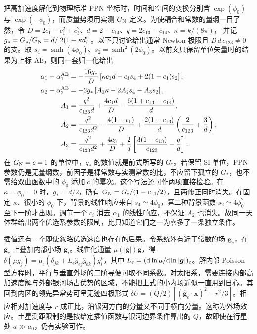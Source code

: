 把高加速度解化到物理标准 PPN 坐标时，时间和空间的变换分别含 $\exp(\phi_0)$ 与 $\exp(-\phi_0)$，而质量势须用实测 $G_{\rm N}$ 定义。为使耦合和常数的量纲一目了然，令
$D=2c_1-c_1^2+c_3^2$、$d=2-c_{14}$、$q=2c_{13}-c_{14}$、$\kappa=k/(8\pi)$，
并记 $g_*=G_*/G_{\rm N}=d/[2(1+\kappa d)]$。以下只讨论给出通常 Newton 极限且 $D\,d\,c_{123}\ne0$ 的支。取 $s_4=\sinh(4\phi_0)$、$s_2=\sinh^2(2\phi_0)$。以前文只保留单位矢量时的结果为上标 $\mathrm{AE}$，则同一套归一化给出
\begin{align*}
 \alpha_1-\alpha_1^{\rm AE}
     &=-\frac{16g_*}{D}
            \left[\kappa c_1 d-c_3s_4+2(1-c_1)s_2\right],\\
 \alpha_2-\alpha_2^{\rm AE}
     &=-2g_*\left[A_1 \kappa-2A_2s_4-A_3s_2\right],\\
 A_1&=\frac{q^2}{c_{123}d}+\frac{4c_1d}{D}
                    -\frac{6(1+c_{13}-c_{14})}{d},\\
 A_2&=\frac{q^2}{c_{123}d^2}-\frac{4(1-c_1)}{D}
                +\frac{2(1-c_{13})}{d}\left(\frac{2}{c_{123}}+\frac{3}{d}\right),\\
 A_3&=\frac{q^2}{c_{123}d^2}+\frac{4c_3}{D}
                +\frac{2}{d}\left[\frac{3(1-c_{13})}{c_{123}}-\frac{q}{d}\right].
\end{align*}
在 $G_{\rm N}=c=1$ 的单位中，$g_*$ 的数值就是前式所写的 $G_*$。若保留 SI 单位，PPN 参数仍是无量纲数，前因子是裸常数与实测常数的比，不应留下孤立的 $G_*$，也不需给双曲函数中的 $\phi_0$ 添加 $c$ 的幂次。这个写法还可作两项直接检验。在 $\kappa=\phi_0=0$ 时，$g_*=d/2$，确有 $G_{\rm N}=G_*/(1-c_{14}/2)$，且两修正同时消失。在固定 $\kappa$、很小的 $\phi_0$ 下，背景的线性响应来自 $s_4\simeq4\phi_0$，第二种背景函数 $s_2\simeq4\phi_0^2$ 至下一阶才出现。调节一个 $c_i$ 消去 $\alpha_1$ 的线性响应，不保证 $A_2$ 也消失。故同一天体群给出两个优选系参数的限制，比只知道它们之一为零多了一条独立条件。

插值还有一个即使忽略优选速度也存在的后果。令系统外有近于常数的场 $\bm g_e$，在 $\bm g_e$ 上叠加内部小场 $\bm g_i$。线性化通量 $\mu(|\bm g|)\bm g$，得 $\delta(\mu g_j)=\mu_e(\delta_{jk}+L_e\hat g_{e j}\hat g_{e k})g_i^k$，其中 $L_e=(\dd\ln\mu/\dd\ln|\bm g|)_e$。解内部 Poisson 型方程时，平行与垂直外场的二阶导便可取不同系数。对太阳系，需要连接内部高加速度解与外部银河场占优势的区域，不能把上式的小内场近似一直用到日心。其回到内区的领先异常势可呈无迹四极形式 $\delta U=(Q/2)[(\hat{\bm g}_e\cdot\bm x)^2-r^2/3]$。相应相对加速度与 $r$ 成正比，沿银河方向的分量又不同于横向分量。这称为外场效应。土星测距限制的是按给定插值函数与银河边界条件算出的 $Q$，故即使在行星处 $a\gg a_0$，仍有实验可作。

